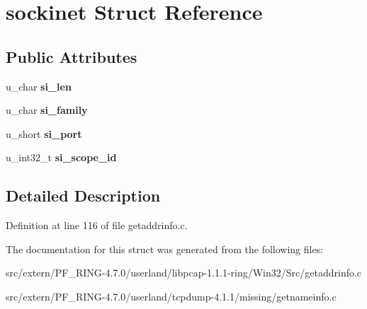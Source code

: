 \hypertarget{structsockinet}{
\section{sockinet Struct Reference}
\label{structsockinet}
}
\subsection*{Public Attributes}
\begin{DoxyCompactItemize}
\item 
\hypertarget{structsockinet_a5c0636b3a31ae77d747a3c682a3add24}{
u\_\-char {\bfseries si\_\-len}}
\label{structsockinet_a5c0636b3a31ae77d747a3c682a3add24}

\item 
\hypertarget{structsockinet_adf27306d71e27485a069c676c9092e6d}{
u\_\-char {\bfseries si\_\-family}}
\label{structsockinet_adf27306d71e27485a069c676c9092e6d}

\item 
\hypertarget{structsockinet_aea8fa744a2afe7d8722c28513e0ac8cd}{
u\_\-short {\bfseries si\_\-port}}
\label{structsockinet_aea8fa744a2afe7d8722c28513e0ac8cd}

\item 
\hypertarget{structsockinet_aba370928e26c7430e34547ffbef5f629}{
u\_\-int32\_\-t {\bfseries si\_\-scope\_\-id}}
\label{structsockinet_aba370928e26c7430e34547ffbef5f629}

\end{DoxyCompactItemize}


\subsection{Detailed Description}


Definition at line 116 of file getaddrinfo.c.



The documentation for this struct was generated from the following files:\begin{DoxyCompactItemize}
\item 
src/extern/PF\_\-RING-\/4.7.0/userland/libpcap-\/1.1.1-\/ring/Win32/Src/getaddrinfo.c\item 
src/extern/PF\_\-RING-\/4.7.0/userland/tcpdump-\/4.1.1/missing/getnameinfo.c\end{DoxyCompactItemize}
